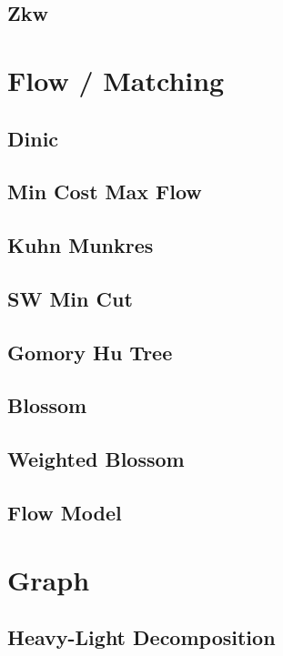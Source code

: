 \subsection{Zkw}


\section{Flow / Matching}
\subsection{Dinic}

\subsection{Min Cost Max Flow}

\subsection{Kuhn Munkres}

\subsection{SW Min Cut}

\subsection{Gomory Hu Tree}

\subsection{Blossom}

\subsection{Weighted Blossom}

\subsection{Flow Model}


\section{Graph}
\subsection{Heavy-Light Decomposition}

